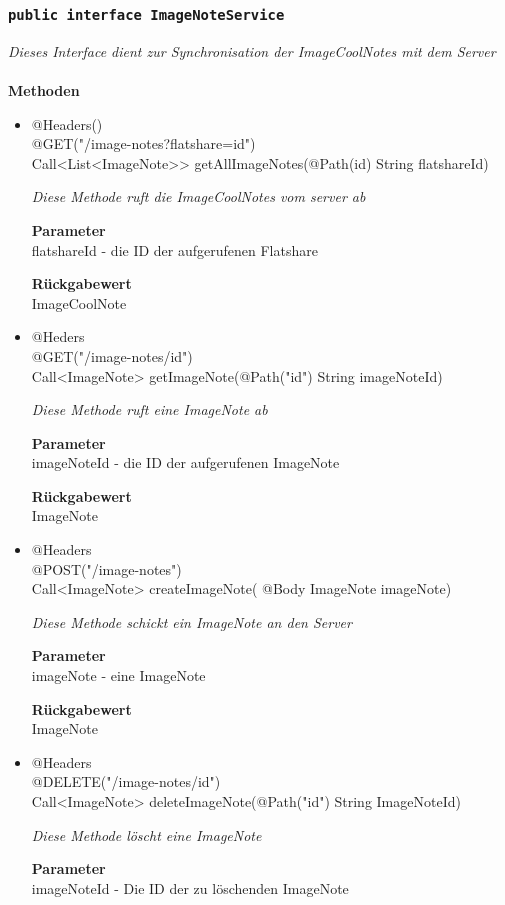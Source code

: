 	\subsubsection{\texttt{public interface ImageNoteService }}
\textit{Dieses Interface dient zur Synchronisation der ImageCoolNotes mit dem Server}\\
\\
	\textbf{Methoden} \\
		\begin{itemize}
		\item{@Headers()\\ @GET("/image-notes?flatshare={id}")\\
Call<List<ImageNote>> getAllImageNotes(@Path(\grqq id\grqq) String flatshareId)}

		\textit{Diese Methode ruft die ImageCoolNotes vom server ab}

		\textbf{Parameter} \\
	flatshareId - die ID der aufgerufenen Flatshare   

		\textbf{Rückgabewert} \\
	ImageCoolNote

      \item{@Heders\\ @GET("/image-notes/{id}")\\ Call<ImageNote> getImageNote(@Path("\grqq id\grqq") String imageNoteId)}

		\textit{Diese Methode ruft eine ImageNote ab }

		\textbf{Parameter} \\
		 imageNoteId - die ID der aufgerufenen ImageNote  

		\textbf{Rückgabewert} \\
	ImageNote

	\item{@Headers\\ @POST("/image-notes")\\ Call<ImageNote> createImageNote( @Body ImageNote imageNote)}

		\textit{Diese Methode schickt ein ImageNote an den Server}

		\textbf{Parameter} \\
		 imageNote - eine ImageNote  

		\textbf{Rückgabewert} \\
	ImageNote

	     \item{@Headers\\ @DELETE("/image-notes/{id}")\\Call<ImageNote> deleteImageNote(@Path("\grqq id\grqq") String ImageNoteId)}

		\textit{Diese Methode löscht eine ImageNote}

		\textbf{Parameter} \\
		 imageNoteId - Die ID der zu löschenden ImageNote  

	 \end{itemize}



